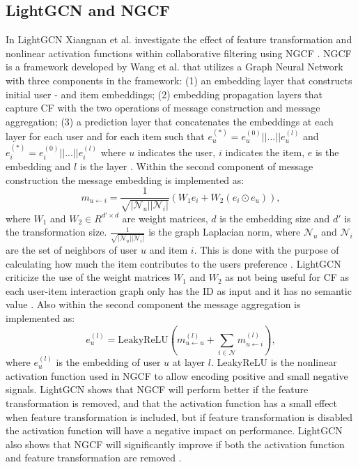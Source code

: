 \subsection{LightGCN and NGCF}\label{subsec:lightgcn-ngcf}
In LightGCN Xiangnan et al. investigate the effect of feature transformation and nonlinear activation functions within collaborative filtering using NGCF \cite{lightgcn}.
NGCF is a framework developed by Wang et al. \cite{NGCF_2019} that utilizes a Graph Neural Network with three components in the framework: (1) an embedding layer that constructs initial user - and item embeddings; (2) embedding propagation layers that capture CF with the two operations of message construction and message aggregation; (3) a prediction layer that concatenates the embeddings at each layer for each user and for each item such that $e_{u}^{(*)} = e_{u}^{(0)}||...||e_{u}^{(l)}$ and $e_{i}^{(*)} = e_{i}^{(0)}||...||e_{i}^{(l)}$ where $u$ indicates the user, $i$ indicates the item, $e$ is the embedding and $l$ is the layer \cite{NGCF_2019}.
Within the second component of message construction the message embedding is implemented as:
\begin{equation}
    m_{u \leftarrow i} = \frac{1}{\sqrt{|\mathcal{N}_u||\mathcal{N}_i|}}(W_1e_i + W_2(e_i \odot e_u)),
    \label{eq:message-construction}
\end{equation}
where $W_1$ and $W_2 \in R^{d' \times d}$ are weight matrices, $d$ is the embedding size and $d'$ is the transformation size.
$\frac{1}{\sqrt{|\mathcal{N}_u||\mathcal{N}_i|}}$ is the graph Laplacian norm, where $\mathcal{N}_u$ and $\mathcal{N}_i$ are the set of neighbors of user $u$ and item $i$.
This is done with the purpose of calculating how much the item contributes to the users preference \cite{NGCF_2019}.
LightGCN criticize the use of the weight matrices $W_1$ and $W_2$ as not being useful for CF as each user-item interaction graph only has the ID as input and it has no semantic value \cite{lightgcn}.
Also within the second component the message aggregation is implemented as:
\begin{equation}
    e_{u}^{(l)} = \mbox{LeakyReLU}(m^{(l)}_{u \leftarrow u} + \sum^{}_{i \in \mathcal{N}} m^{(l)}_{u \leftarrow i}),
\end{equation}
where $e_{u}^{(l)}$ is the embedding of user $u$ at layer $l$.
LeakyReLU is the nonlinear activation function used in NGCF to allow encoding positive and small negative signals.
LightGCN shows that NGCF will perform better if the feature transformation is removed, and that the activation function has a small effect when feature transformation is included, but if feature transformation is disabled the activation function will have a negative impact on performance.
LightGCN also shows that NGCF will significantly improve if both the activation function and feature transformation are removed \cite{lightgcn}.

